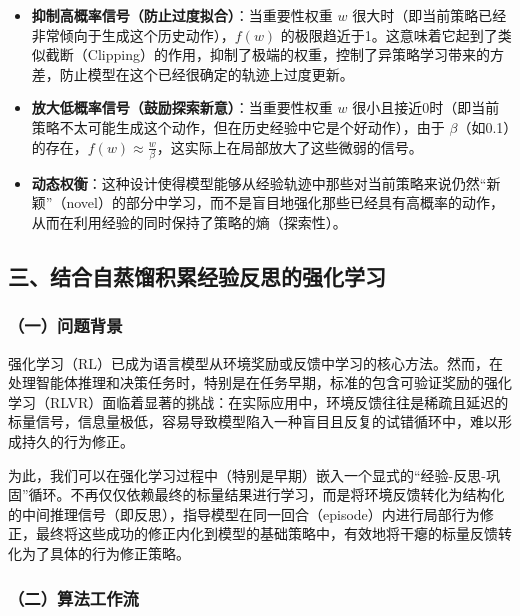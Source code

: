 \begin{itemize}
\tightlist
\item
  \textbf{抑制高概率信号（防止过度拟合）}：当重要性权重 \(w\) 很大时（即当前策略已经非常倾向于生成这个历史动作），\(f(w)\) 的极限趋近于1。这意味着它起到了类似截断（Clipping）的作用，抑制了极端的权重，控制了异策略学习带来的方差，防止模型在这个已经很确定的轨迹上过度更新。
\item
  \textbf{放大低概率信号（鼓励探索新意）}：当重要性权重 \(w\) 很小且接近0时（即当前策略不太可能生成这个动作，但在历史经验中它是个好动作），由于 \(\beta\)（如0.1）的存在，\(f(w)\approx\frac{w}{\beta}\)，这实际上在局部放大了这些微弱的信号。
\item
  \textbf{动态权衡}：这种设计使得模型能够从经验轨迹中那些对当前策略来说仍然``新颖''（novel）的部分中学习，而不是盲目地强化那些已经具有高概率的动作，从而在利用经验的同时保持了策略的熵（探索性）。
\end{itemize}

\hypertarget{ux4e09ux7ed3ux5408ux81eaux84b8ux998fux79efux7d2fux7ecfux9a8cux53cdux601dux7684ux5f3aux5316ux5b66ux4e60}{%
\subsection{三、结合自蒸馏积累经验反思的强化学习}\label{ux4e09ux7ed3ux5408ux81eaux84b8ux998fux79efux7d2fux7ecfux9a8cux53cdux601dux7684ux5f3aux5316ux5b66ux4e60}}

\hypertarget{ux4e00ux95eeux9898ux80ccux666f-1}{%
\subsubsection{（一）问题背景}\label{ux4e00ux95eeux9898ux80ccux666f-1}}

强化学习（RL）已成为语言模型从环境奖励或反馈中学习的核心方法。然而，在处理智能体推理和决策任务时，特别是在任务早期，标准的包含可验证奖励的强化学习（RLVR）面临着显著的挑战：在实际应用中，环境反馈往往是稀疏且延迟的标量信号，信息量极低，容易导致模型陷入一种盲目且反复的试错循环中，难以形成持久的行为修正。

为此，我们可以在强化学习过程中（特别是早期）嵌入一个显式的``经验-反思-巩固''循环。不再仅仅依赖最终的标量结果进行学习，而是将环境反馈转化为结构化的中间推理信号（即反思），指导模型在同一回合（episode）内进行局部行为修正，最终将这些成功的修正内化到模型的基础策略中，有效地将干瘪的标量反馈转化为了具体的行为修正策略。

\hypertarget{ux4e8cux7b97ux6cd5ux5de5ux4f5cux6d41}{%
\subsubsection{（二）算法工作流}\label{ux4e8cux7b97ux6cd5ux5de5ux4f5cux6d41}}

